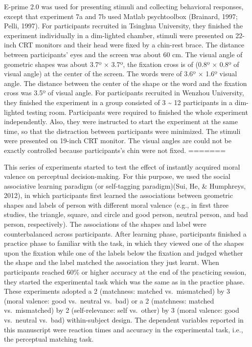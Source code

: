 \documentclass[
  man]{apa6}
\begin{document}
E-prime 2.0 was used for presenting stimuli and collecting behavioral responses, except that experiment 7a and 7b used Matlab psychtoolbox (Brainard, 1997; Pelli, 1997). For participants recruited in Tsinghua University, they finished the experiment individually in a dim-lighted chamber, stimuli were presented on 22-inch CRT monitors and their head were fixed by a chin-rest brace. The distance between participants' eyes and the screen was about 60 cm. The visual angle of geometric shapes was about 3.7º × 3.7º, the fixation cross is of (0.8º × 0.8º of visual angle) at the center of the screen. The words were of 3.6º × 1.6º visual angle. The distance between the center of the shape or the word and the fixation cross was 3.5º of visual angle. For participants recruited in Wenzhou University, they finished the experiment in a group consisted of 3 \textasciitilde{} 12 participants in a dim-lighted testing room. Participants were required to finished the whole experiment independently. Also, they were instructed to start the experiment at the same time, so that the distraction between participants were minimized. The stimuli were presented on 19-inch CRT monitor. The visual angles are could not be exactly controlled because participants's chin were not fixed.
=======

This series of experiments started to test the effect of instantly acquired moral valence on perceptual decision-making. For this purpose, we used the social associative learning paradigm (or self-tagging paradigm)(Sui, He, \& Humphreys, 2012), in which participants first learned the associations between geometric shapes and labels of person with different moral valence (e.g., in first three studies, the triangle, square, and circle and good person, neutral person, and bad person, respectively). The associations of the shapes and label were counterbalanced across participants. After learning phase, participants finished a practice phase to familiar with the task, in which they viewed one of the shapes upon the fixation while one of the labels below the fixation and judged whether the shape and the label matched the association they just learnt. When participants reached 60\% or higher accuracy at the end of the practicing session, they started the experimental task which was the same as in the practice phase. These experiments adopted a 2 (matchness: matched vs.~mismatched) by 3 (moral valence: good vs.~neutral vs.~bad) or a 2 (matchness: matched vs.~mismatched) by 2 (self-relevance: self vs.~other) by 3 (moral valence: good vs.~neutral vs.~bad) within-subject design. The dependent variables reported in this manuscript were reaction times and accuracy in the experimental task, i.e., the perceptual matching task.
\end{document}
